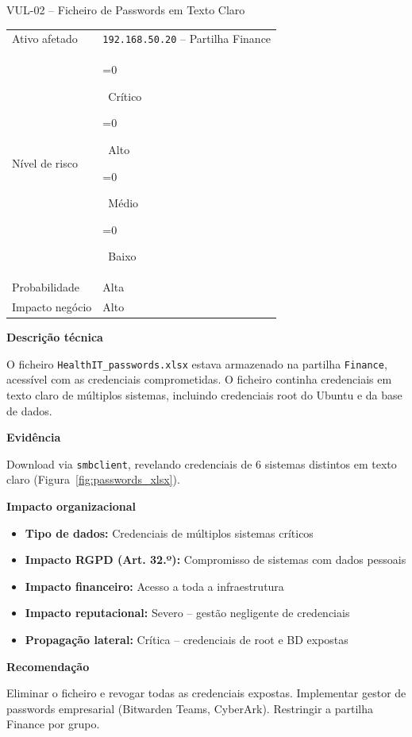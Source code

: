 \documentclass[12pt, a4paper]{report}
\newcommand{\risk}[1]{%
  \ifnum\pdfstrcmp{#1}{Critico}=0{\colorbox{Critical}{\color{white}\bfseries\footnotesize\strut~Crítico~}}\fi
  \ifnum\pdfstrcmp{#1}{Alto}=0{\colorbox{High}{\color{white}\bfseries\footnotesize\strut~Alto~}}\fi
  \ifnum\pdfstrcmp{#1}{Medio}=0{\colorbox{Medium}{\color{black}\bfseries\footnotesize\strut~Médio~}}\fi
  \ifnum\pdfstrcmp{#1}{Baixo}=0{\colorbox{Low}{\color{white}\bfseries\footnotesize\strut~Baixo~}}\fi}
\begin{document}
\vspace{0.8em}
\newpage

\begin{finding}{VUL-02 -- Ficheiro de Passwords em Texto Claro}
\begin{tabular}{@{}ll@{}}
  \small\color{TextGray}Ativo afetado   & \texttt{192.168.50.20} -- Partilha Finance \\[3pt]
  \small\color{TextGray}Nível de risco  & \risk{Critico} \\[3pt]
  \small\color{TextGray}Probabilidade   & Alta \\[3pt]
  \small\color{TextGray}Impacto negócio & Alto \\
\end{tabular}

\vspace{8pt}\textbf{Descrição técnica}

O ficheiro \texttt{HealthIT\_passwords.xlsx} estava armazenado na partilha \texttt{Finance},
acessível com as credenciais comprometidas. O ficheiro continha credenciais em texto claro de
múltiplos sistemas, incluindo credenciais root do Ubuntu e da base de dados.

\vspace{6pt}\textbf{Evidência}

Download via \texttt{smbclient}, revelando credenciais de 6 sistemas distintos em texto claro
(Figura~\ref{fig:passwords_xlsx}).

\vspace{4pt}\textbf{Impacto organizacional}
\begin{itemize}[itemsep=1pt]
  \item \textbf{Tipo de dados:} Credenciais de múltiplos sistemas críticos
  \item \textbf{Impacto RGPD (Art. 32.º):} Compromisso de sistemas com dados pessoais
  \item \textbf{Impacto financeiro:} Acesso a toda a infraestrutura
  \item \textbf{Impacto reputacional:} Severo -- gestão negligente de credenciais
  \item \textbf{Propagação lateral:} Crítica -- credenciais de root e BD expostas
\end{itemize}

\vspace{4pt}\textbf{Recomendação}

Eliminar o ficheiro e revogar todas as credenciais expostas. Implementar gestor de passwords
empresarial (Bitwarden Teams, CyberArk). Restringir a partilha Finance por grupo.
\end{finding}
\end{document}
